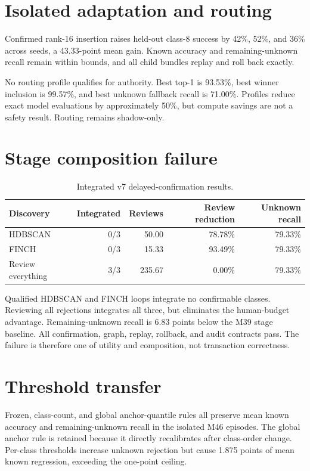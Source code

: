 \documentclass[12pt,oneside]{report}
\begin{document}
\section{Isolated adaptation and routing}

Confirmed rank-16 insertion raises held-out class-8 success by 42\%, 52\%,
and 36\% across seeds, a 43.33-point mean gain. Known accuracy and
remaining-unknown recall remain within bounds, and all child bundles replay and
roll back exactly.

No routing profile qualifies for authority. Best top-1 is 93.53\%, best winner
inclusion is 99.57\%, and best unknown fallback recall is 71.00\%. Profiles
reduce exact model evaluations by approximately 50\%, but compute savings are
not a safety result. Routing remains shadow-only.

\section{Stage composition failure}

\begin{table}[ht]
\centering
\caption{Integrated v7 delayed-confirmation results.}
\label{tab:integrated}
\begin{tabular}{lrrrr}
\toprule
Discovery & Integrated & Reviews & Review reduction & Unknown recall\\
\midrule
HDBSCAN & 0/3 & 50.00 & 78.78\% & 79.33\%\\
FINCH & 0/3 & 15.33 & 93.49\% & 79.33\%\\
Review everything & 3/3 & 235.67 & 0.00\% & 79.33\%\\
\bottomrule
\end{tabular}
\end{table}

Qualified HDBSCAN and FINCH loops integrate no confirmable classes. Reviewing
all rejections integrates all three, but eliminates the human-budget advantage.
Remaining-unknown recall is 6.83 points below the M39 stage baseline. All
confirmation, graph, replay, rollback, and audit contracts pass. The failure is
therefore one of utility and composition, not transaction correctness.

\section{Threshold transfer}

Frozen, class-count, and global anchor-quantile rules all preserve mean known
accuracy and remaining-unknown recall in the isolated M46 episodes. The global
anchor rule is retained because it directly recalibrates after class-order
change. Per-class thresholds increase unknown rejection but cause 1.875 points
of mean known regression, exceeding the one-point ceiling.
\end{document}
